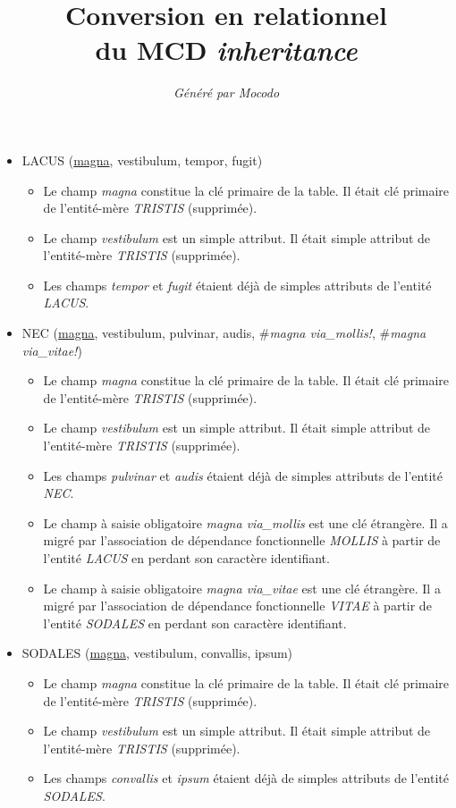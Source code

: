 \documentclass[a4paper]{article}
\title{Conversion en relationnel\\du MCD \emph{inheritance}}
\author{\emph{Généré par Mocodo}}
\newcommand{\relat}[1]{\textsc{#1}}
\newcommand{\attr}[1]{#1}
\newcommand{\prim}[1]{\uline{#1}}
\newcommand{\foreign}[1]{\#\textsl{#1}}
\begin{document}
\maketitle

\begin{itemize}
  \item \relat{LACUS} (\prim{magna}, \attr{vestibulum}, \attr{tempor}, \attr{fugit})
  \begin{itemize}
    \item Le champ \emph{magna} constitue la clé primaire de la table. Il était clé primaire de l'entité-mère \emph{TRISTIS} (supprimée).
    \item Le champ \emph{vestibulum} est un simple attribut. Il était simple attribut de l'entité-mère \emph{TRISTIS} (supprimée).
    \item Les champs \emph{tempor} et \emph{fugit} étaient déjà de simples attributs de l'entité \emph{LACUS}.
  \end{itemize}

  \item \relat{NEC} (\prim{magna}, \attr{vestibulum}, \attr{pulvinar}, \attr{audis}, \foreign{magna via_mollis!}, \foreign{magna via_vitae!})
  \begin{itemize}
    \item Le champ \emph{magna} constitue la clé primaire de la table. Il était clé primaire de l'entité-mère \emph{TRISTIS} (supprimée).
    \item Le champ \emph{vestibulum} est un simple attribut. Il était simple attribut de l'entité-mère \emph{TRISTIS} (supprimée).
    \item Les champs \emph{pulvinar} et \emph{audis} étaient déjà de simples attributs de l'entité \emph{NEC}.
    \item Le champ à saisie obligatoire \emph{magna via_mollis} est une clé étrangère. Il a migré par l'association de dépendance fonctionnelle \emph{MOLLIS} à partir de l'entité \emph{LACUS} en perdant son caractère identifiant.
    \item Le champ à saisie obligatoire \emph{magna via_vitae} est une clé étrangère. Il a migré par l'association de dépendance fonctionnelle \emph{VITAE} à partir de l'entité \emph{SODALES} en perdant son caractère identifiant.
  \end{itemize}

  \item \relat{SODALES} (\prim{magna}, \attr{vestibulum}, \attr{convallis}, \attr{ipsum})
  \begin{itemize}
    \item Le champ \emph{magna} constitue la clé primaire de la table. Il était clé primaire de l'entité-mère \emph{TRISTIS} (supprimée).
    \item Le champ \emph{vestibulum} est un simple attribut. Il était simple attribut de l'entité-mère \emph{TRISTIS} (supprimée).
    \item Les champs \emph{convallis} et \emph{ipsum} étaient déjà de simples attributs de l'entité \emph{SODALES}.
  \end{itemize}


\end{itemize}
\end{document}
